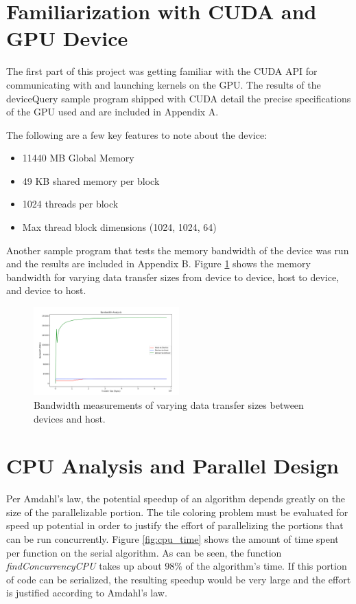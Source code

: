 \documentclass[journal]{IEEEtran}
\begin{document}
\section{Familiarization with CUDA and GPU Device}

The first part of this project was getting familiar with the CUDA API for communicating with and launching kernels on the GPU. The results of the deviceQuery sample program shipped with CUDA detail the precise specifications of the GPU used and are included in Appendix A.

The following are a few key features to note about the device:
\begin{itemize}
  \item 11440 MB Global Memory
  \item 49 KB shared memory per block
  \item 1024 threads per block
  \item Max thread block dimensions (1024, 1024, 64)
\end{itemize}

Another sample program that tests the memory bandwidth of the device was run and the results are included in Appendix B. Figure \ref{fig:bandwidth} shows the memory bandwidth for varying data transfer sizes from device to device, host to device, and device to host.

\begin{figure}[ht]
\centering
\includegraphics[width=0.5\textwidth]{bandwidth_analysis}
\caption{Bandwidth measurements of varying data transfer sizes between devices and host.}
\label{fig:bandwidth}
\end{figure}

\section{CPU Analysis and Parallel Design}

Per Amdahl's law, the potential speedup of an algorithm depends greatly on the size of the parallelizable portion. The tile coloring problem must be evaluated for speed up potential in order to justify the effort of parallelizing the portions that can be run concurrently. Figure \ref{fig:cpu_time} shows the amount of time spent per function on the serial algorithm. As can be seen, the function \emph{findConcurrencyCPU} takes up about 98\% of the algorithm's time. If this portion of code can be serialized, the resulting speedup would be very large and the effort is justified according to Amdahl's law.
\end{document}
